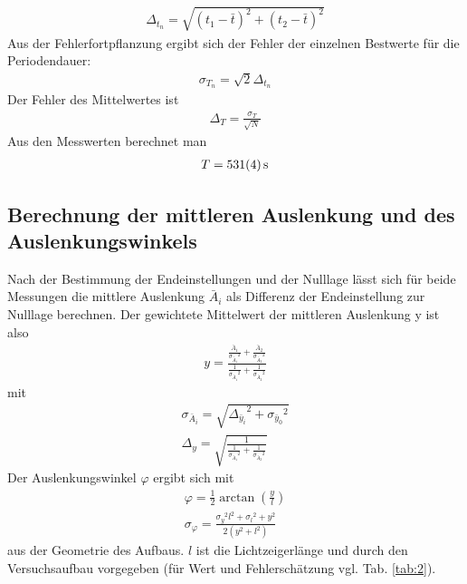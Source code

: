 \begin{align}
\Delta_{t_n}=\sqrt{\left(t_1-\bar{t}\right)^2+\left(t_2-\bar{t}\right)^2}
\end{align}
Aus der Fehlerfortpflanzung ergibt sich der Fehler der einzelnen Bestwerte für die Periodendauer:
\begin{align}
\sigma_{T_n}=\sqrt{2}\Delta_{t_n}
\end{align}
Der Fehler des Mittelwertes ist
\begin{align}
\Delta_T=\frac{\sigma_T}{\sqrt{N}}
\end{align}
Aus den Messwerten berechnet man
\begin{align}
T=\SI{531\pm4}{\second}
\end{align}
\subsection{Berechnung der mittleren Auslenkung und des Auslenkungswinkels}
Nach der Bestimmung der Endeinstellungen und der Nulllage lässt sich für beide Messungen die mittlere Auslenkung $\bar{A}_i$ als Differenz der Endeinstellung zur Nulllage berechnen. Der gewichtete Mittelwert der mittleren Auslenkung y ist also
\begin{align}
y=\frac{\frac{\bar{A}_1}{{\sigma_{\bar{A}_1}}^2}+\frac{\bar{A}_2}{{\sigma_{\bar{A}_2}}^2}}{\frac{1}{{\sigma_{\bar{A}_1}}^2}+\frac{1}{{\sigma_{\bar{A}_2}}^2}}
\end{align} 
mit
\begin{align}
\sigma_{\bar{A}_i}=\sqrt{{\Delta_{\bar{y}_i}}^2+{\sigma_{\bar{y}_0}}^2}\\
\Delta_y=\sqrt{\frac{1}{\frac{1}{{\sigma_{\bar{A}_1}}^2}+\frac{1}{{\sigma_{\bar{A}_2}}^2}}}
\end{align}
Der Auslenkungswinkel $\varphi$ ergibt sich mit
\begin{align}
\varphi=\frac{1}{2}\arctan\left(\frac{y}{l}\right)\\
\sigma_\varphi=\frac{{\sigma_y}^2l^2+{\sigma_l}^2+y^2}{2(y^2+l^2)}
\end{align}
aus der Geometrie des Aufbaus. $l$ ist die Lichtzeigerlänge und durch den Versuchsaufbau vorgegeben (für Wert und Fehlerschätzung vgl. Tab. \ref{tab:2}).
